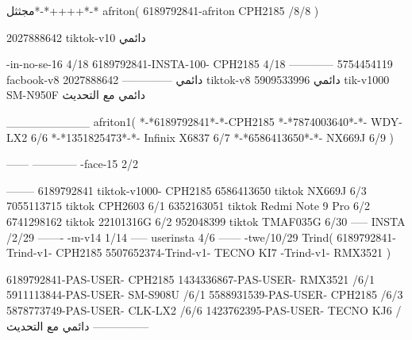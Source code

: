 مجثثل*-*++++*-*
afriton(
6189792841-afriton CPH2185  /8/8
)

2027888642 tiktok-v10
دائمي

-in-no-se-16 4/18
6189792841-INSTA-100- CPH2185 4/18
------------
5754454119 facbook-v8
دائمي
--------------
2027888642 tiktok-v8
دائمي
5909533996 tik-v1000  SM-N950F
دائمي مع التحديث

__________
afriton1(
*-*6189792841*-*-CPH2185
*-*7874003640*-*- WDY-LX2  6/6
*-*1351825473*-*- Infinix X6837  6/7
*-*6586413650*-*- NX669J  6/9
)


------
------------
-face-15 2/2

--------
6189792841 tiktok-v1000- CPH2185 
6586413650 tiktok NX669J  6/3
7055113715 tiktok  CPH2603   6/1
6352163051 tiktok  Redmi Note 9 Pro   6/2
6741298162 tiktok 22101316G  6/2
952048399 tiktok TMAF035G  6/30
-----
 INSTA /2/29
-------
-m-v14 1/14
-----
userinsta 4/6
------
-twe/10/29
Trind(
6189792841-Trind-v1- CPH2185 
5507652374-Trind-v1- TECNO KI7 \6-Trind-v1- RMX3521 \6\7
)


6189792841-PAS-USER- CPH2185 
1434336867-PAS-USER-  RMX3521  /6/1
5911113844-PAS-USER-  SM-S908U  /6/1
5588931539-PAS-USER- CPH2185  /6/3
5878773749-PAS-USER- CLK-LX2  /6/6
1423762395-PAS-USER- TECNO KJ6  /دائمي مع التحديث
    ---------------

